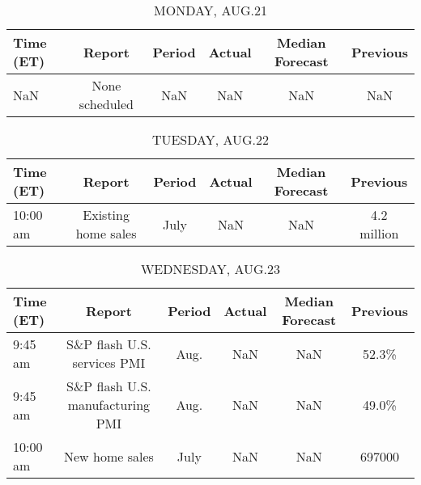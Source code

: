\documentclass{article}%
\begin{document}
%
\normalsize%


\begin{table}[htbp]%
\caption{MONDAY, AUG.21}%
\centering%
\begin{adjustbox}{width=1\textwidth}%
\begin{tabular}{lccccc}
\toprule
Time (ET) &         Report & Period & Actual & Median Forecast & Previous \\
\midrule
      NaN & None scheduled &    NaN &    NaN &             NaN &      NaN \\
\bottomrule
\end{tabular}
%
\end{adjustbox}%
\end{table}

%


\begin{table}[htbp]%
\caption{TUESDAY, AUG.22}%
\centering%
\begin{adjustbox}{width=1\textwidth}%
\begin{tabular}{lccccc}
\toprule
Time (ET) &              Report & Period & Actual & Median Forecast &    Previous \\
\midrule
 10:00 am & Existing home sales &   July &    NaN &             NaN & 4.2 million \\
\bottomrule
\end{tabular}
%
\end{adjustbox}%
\end{table}

%


\begin{table}[htbp]%
\caption{WEDNESDAY, AUG.23}%
\centering%
\begin{adjustbox}{width=1\textwidth}%
\begin{tabular}{lccccc}
\toprule
Time (ET) &                           Report & Period & Actual & Median Forecast & Previous \\
\midrule
  9:45 am &      S\&P flash U.S. services PMI &   Aug. &    NaN &             NaN &    52.3\% \\
  9:45 am & S\&P flash U.S. manufacturing PMI &   Aug. &    NaN &             NaN &    49.0\% \\
 10:00 am &                   New home sales &   July &    NaN &             NaN &   697000 \\
\bottomrule
\end{tabular}
%
\end{adjustbox}%
\end{table}
\end{document}
